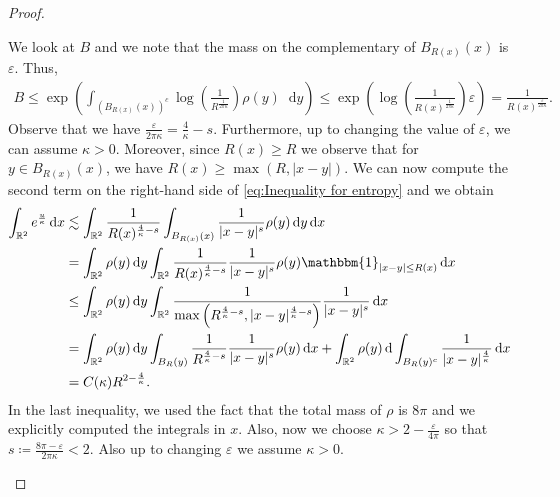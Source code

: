 \documentclass[11pt,a4paper]{article}
\numberwithin{equation}{section}
\newcommand{\R}{{\mathbb{R}}}
\theoremstyle{plain}
\theoremstyle{remark}
\newcommand {\f}{\frac}
\newcommand{\diff}{\mathop{}\!\mathrm{d}}
\newcommand{\ind}{\mathbbm{1}}
\begin{document}
\begin{proof}
\begin{enumeratesteps}
We look at $B$ and we note that the mass on the complementary of $B_{R(x)}(x)$ is $\varepsilon$. Thus, 
\begin{align*}
    B \le  \exp\left( \int_{(B_{R(x)}(x))^c}\log\left(\f{1}{R^{\f{1}{2\pi\kappa}}}\right)\rho(y)\diff y\right) \le \exp\left( \log\left(\f{1}{R(x)^{\f{1}{2\pi\kappa}}}\right) \varepsilon\right)  = \frac{1}{R(x)^{\frac{\varepsilon}{2\pi\kappa}}}.
\end{align*}
%
Observe that we have $\frac{\varepsilon}{2\pi\kappa}=\frac 4\kappa-s$. Furthermore, up to changing the value of $\varepsilon$, we can assume $\kappa>0$. Moreover, since $R(x)\ge R$ we observe that for $y\in B_{R(x)}(x)$, we have $R(x)\ge \max\left(R,|x-y|\right)$. We can now compute the second term on the right-hand side of \eqref{eq:Inequality for entropy} and we obtain 
\begin{align*}
\int_{\R^2}e^{\f{u}{\kappa}}\diff x 
&\lesssim \int_{\R^2} \frac{1}{R(x)^{\frac{4}{\kappa}-s}}\int_{B_{R(x)}(x)}\f{1}{|x-y|^s}\rho(y)\diff y\diff x\\
&=\int_{\R^2}\rho(y)\diff y\int_{\R^2}\frac{1}{R(x)^{\frac{4}{\kappa}-s}}\f{1}{|x-y|^s}\rho(y)\ind_{|x-y|\le R(x)}\diff x \\
&\leq \int_{\R^2}\rho(y)\diff y\int_{\R^2} \frac{1}{\max\left(R^{\frac{4}{\kappa}-s}, |x-y|^{\frac{4}{\kappa}-s}\right)}\f{1}{|x-y|^s}\diff x\\
&=\int_{\R^2}\rho(y)\diff y\int_{B_{R}(y)}\frac{1}{R^{\frac{4}{\kappa}-s}}\f{1}{|x-y|^s}\rho(y)\diff x  + \int_{\R^2}\rho(y)\diff\int_{ B_{R}(y)^c}\f{1}{|x-y|^{\frac{4}{\kappa}}}\diff x \\
&= C(\kappa) R^{2-\frac{4}{\kappa}}.
\end{align*}
In the last inequality, we used the fact that the total mass of $\rho$ is $8\pi$ and we explicitly computed the integrals in $x$.
%
%
\iffalse Also, now we choose $\kappa>2 - \f{\varepsilon}{4\pi}$ so that $s\coloneqq\f{8\pi-\varepsilon}{2\pi\kappa}<2.$ Also up to changing $\varepsilon$ we assume $\kappa>0$. 


\end{enumeratesteps}
\end{proof}
\end{document}
